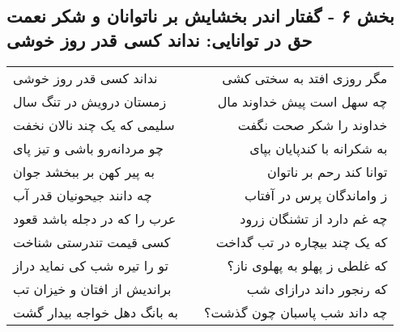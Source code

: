 \begin{center}
\section*{بخش ۶ - گفتار اندر بخشایش بر ناتوانان و شکر  نعمت حق در توانایی: نداند کسی قدر روز خوشی}
\label{sec:006}
\begin{longtable}{l p{0.5cm} r}
نداند کسی قدر روز خوشی
&&
مگر روزی افتد به سختی کشی
\\
زمستان درویش در تنگ سال
&&
چه سهل است پیش خداوند مال
\\
سلیمی که یک چند نالان نخفت
&&
خداوند را شکر صحت نگفت
\\
چو مردانه‌رو باشی و تیز پای
&&
به شکرانه با کندپایان بپای
\\
به پیر کهن بر ببخشد جوان
&&
توانا کند رحم بر ناتوان
\\
چه دانند جیحونیان قدر آب
&&
ز واماندگان پرس در آفتاب
\\
عرب را که در دجله باشد قعود
&&
چه غم دارد از تشنگان زرود
\\
کسی قیمت تندرستی شناخت
&&
که یک چند بیچاره در تب گداخت
\\
تو را تیره شب کی نماید دراز
&&
که غلطی ز پهلو به پهلوی ناز؟
\\
براندیش از افتان و خیزان تب
&&
که رنجور داند درازای شب
\\
به بانگ دهل خواجه بیدار گشت
&&
چه داند شب پاسبان چون گذشت؟
\\
\end{longtable}
\end{center}
